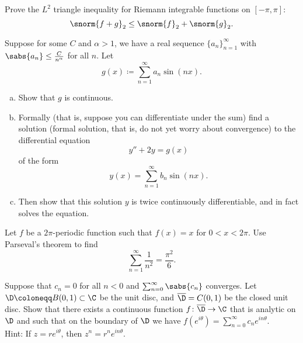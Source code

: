\begin{exercise}
Prove the $L^2$ triangle inequality 
for Riemann integrable functions on $[-\pi,\pi]$:
\begin{equation*}
\snorm{f+g}_2 \leq \snorm{f}_2 + \snorm{g}_2 .
\end{equation*}
\end{exercise}

\begin{exercise}
\pagebreak[3]
Suppose for some $C$ and $\alpha > 1$, we have
a real sequence $\{ a_n \}_{n=1}^\infty$ with
$\sabs{a_n} \leq \frac{C}{n^\alpha}$ for all $n$.
Let
\begin{equation*}
g(x) \coloneqq \sum_{n=1}^\infty a_n \sin(n x) .
\end{equation*}
\begin{enumerate}[a)]
\item
Show that $g$ is continuous.
\item
Formally (that is, suppose you can differentiate under the sum)
find a solution (formal solution, that is, do not yet worry about convergence)
to the differential equation
\begin{equation*}
y''+ 2 y = g(x)
\end{equation*}
of the form
\begin{equation*}
y(x) = \sum_{n=1}^\infty b_n \sin(n x) .
\end{equation*}
\item
Then show that this solution $y$ is twice continuously differentiable,
and in fact solves the equation.
\end{enumerate}
\end{exercise}

\begin{exercise}
Let $f$ be a $2\pi$-periodic  function such
that $f(x) = x$ for $0 < x < 2\pi$.
Use Parseval's theorem to find
\begin{equation*}
\sum_{n=1}^\infty \frac{1}{n^2} = \frac{\pi^2}{6} .
\end{equation*}
\end{exercise}

\begin{exercise}
Suppose that $c_n = 0$ for all $n < 0$ and $\sum_{n=0}^\infty \sabs{c_n}$
converges.  Let $\D \coloneqq B(0,1) \subset \C$ be the unit disc,
and $\overline{\D} = C(0,1)$ be the closed unit disc.
Show that there exists a continuous function
$f \colon \overline{\D} \to \C$ that is analytic on $\D$
and such that on the boundary of $\D$ we have
$f(e^{i\theta}) = \sum_{n=0}^\infty c_n e^{in\theta}$.\\
Hint: If $z=re^{i\theta}$, then $z^n = r^n e^{in\theta}$.
\end{exercise}

